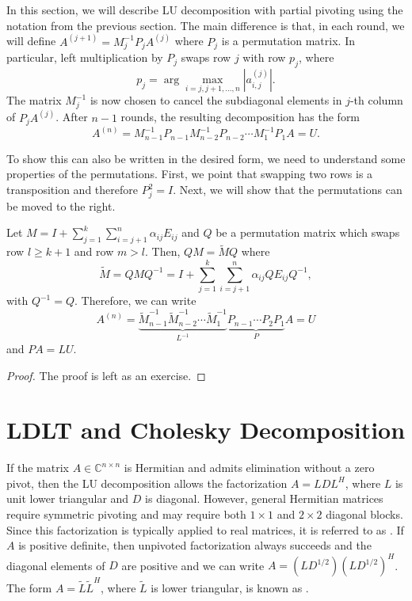 In this section, we will describe LU decomposition with partial pivoting using the notation from the previous section.
The main difference is that, in each round, we will define $A^{(j+1)} = M_j^{-1} P_j A^{(j)}$ where $P_j$ is a permutation matrix.
In particular, left multiplication by $P_j$ swaps row $j$ with row $p_j$, where
\[ p_j = \arg \max_{i=j,j+1,\ldots,n} | a^{(j)}_{i,j} |. \]
The matrix $M_j^{-1}$ is now chosen to cancel the subdiagonal elements in $j$-th column of $P_j A^{(j)}$.
After $n-1$ rounds, the resulting decomposition has the form
\[ A^{(n)} = M_{n-1}^{-1} P_{n-1} M_{n-2}^{-1} P_{n-2} \cdots M_1^{-1} P_1 A = U. \]

To show this can also be written in the desired form, we need to understand some properties of the permutations.
First, we point that swapping two rows is a transposition and therefore $P_j^2 = I$.
Next, we will show that the permutations can be moved to the right.
\begin{lemma}
Let $M = I + \sum_{j=1}^k \sum_{i=j+1}^n \alpha_{ij} E_{ij}$ and $Q$ be a permutation matrix which swaps row $l \geq k+1$ and row $m>l$.
Then, $Q M = \widetilde{M} Q$ where
\[ \widetilde{M} = Q M Q^{-1} = I + \sum_{j=1}^k \sum_{i=j+1}^n \alpha_{ij} Q E_{ij} Q^{-1}, \]
with $Q^{-1} = Q$.
Therefore, we can write
\[ A^{(n)} = \underbrace{\widetilde{M}_{n-1}^{-1} \widetilde{M}_{n-2}^{-1} \cdots \widetilde{M}_1^{-1}}_{L^{-1}} \underbrace{P_{n-1} \cdots P_2 P_1}_P A = U \]
and $ P A = L U$.
\end{lemma}
\begin{proof}
The proof is left as an exercise.
\end{proof}

\section{LDLT and Cholesky Decomposition}

If the matrix $A \in \mathbb{C}^{n \times n}$ is Hermitian and admits elimination without a zero pivot, then the LU decomposition allows the factorization $A = L D L^H$, where $L$ is unit lower triangular and $D$ is diagonal.
However, general Hermitian matrices require symmetric pivoting and may require both $1\times1$ and $2\times2$ diagonal blocks.
Since this factorization is typically applied to real matrices, it is referred to as .
If $A$ is positive definite, then unpivoted factorization always succeeds and the diagonal elements of $D$ are positive and we can write $A = \left(L D^{1/2} \right) \left(L D^{1/2}\right)^H$.
The form $A = \widetilde{L} \widetilde{L}^H$, where $\widetilde{L}$ is lower triangular, is known as .

